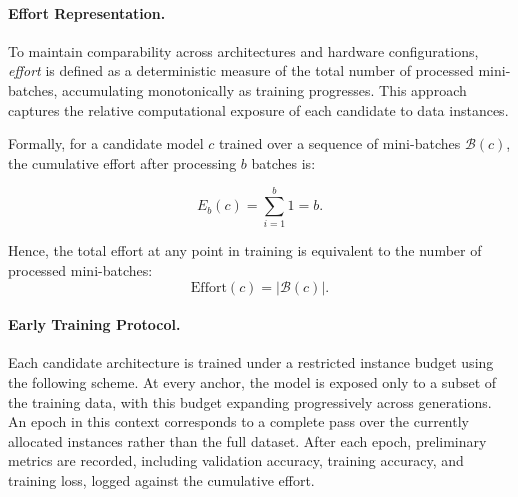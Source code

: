\paragraph{Effort Representation.}  
\label{sec:effort_representation}
To maintain comparability across architectures and hardware configurations, 
\emph{effort} is defined as a deterministic measure of the total number of processed mini-batches, accumulating monotonically as training progresses. This approach captures the relative computational exposure of each candidate to data instances.

Formally, for a candidate model $c$ trained over a sequence of mini-batches $\mathcal{B}(c)$, 
the cumulative effort after processing $b$ batches is:

\[
E_b(c) = \sum_{i=1}^{b} 1 = b.
\]

Hence, the total effort at any point in training is equivalent to the number of processed mini-batches:
\[
\mathrm{Effort}(c) = |\mathcal{B}(c)|.
\]

\paragraph{Early Training Protocol.}  
Each candidate architecture is trained under a restricted instance budget using the following scheme. At every anchor, the model is exposed only to a subset of the training data, with this budget expanding progressively across generations. An epoch in this context corresponds to a complete pass over the currently allocated instances rather than the full dataset. After each epoch, preliminary metrics are recorded, including validation accuracy, training accuracy, and training loss, logged against the cumulative effort.